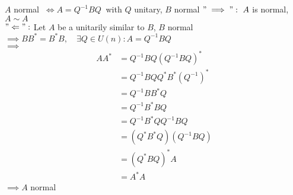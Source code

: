 


\begin{SolutionSheet}[\ref{sheet2}]

  \begin{Solution}
    \Claim $A$ normal $\ \iff A = Q^{-1}BQ \ $ with $Q$ unitary, $B$ normal
    \Claim $"\implies ": \ A$ is normal, $A \sim A$ \\
    $"\Leftarrow ":$ Let $A$ be a unitarily similar to $B$, $B$ normal \\
    $ \implies BB^* = B^*B, \quad\exists Q \in U(n): A = Q^{-1}BQ$ \\
    $ \implies$ \begin{align*}
      AA^* &= Q^{-1}BQ(Q^{-1}BQ)^* \\
      &= Q^{-1}BQ Q^* B^* (Q^{-1})^* \\
      &= Q^{-1} BB^*Q \\
      &= Q^{-1} B^*BQ \\
      &= Q^{-1} B^* QQ^{-1}BQ \\
      &= (Q^* B^* Q)(Q^{-1}BQ) \\
      &= (Q^* B Q)^* A \\
      &= A^* A
    \end{align*}
    $ \implies A$ normal
  \end{Solution}


\end{SolutionSheet}
